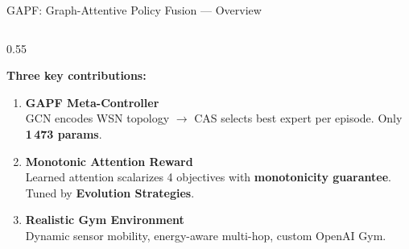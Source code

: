\documentclass[aspectratio=169, 11pt]{beamer}
\begin{document}
\begin{frame}{GAPF: Graph-Attentive Policy Fusion --- Overview}

\begin{columns}[T]
\begin{column}{0.55\textwidth}

  \textbf{Three key contributions:}
  \begin{enumerate}\setlength{\itemsep}{2pt}
    \item \textbf{GAPF Meta-Controller}\\
      {\small GCN encodes WSN topology $\to$ CAS selects best expert per episode. Only \colorbox{polyblue!10}{\textbf{1\,473 params}}.}

    \item \textbf{Monotonic Attention Reward}\\
      {\small Learned attention scalarizes 4 objectives with \textbf{monotonicity guarantee}. Tuned by \textbf{Evolution Strategies}.}

    \item \textbf{Realistic Gym Environment}\\
      {\small Dynamic sensor mobility, energy-aware multi-hop, custom OpenAI Gym.}
  \end{enumerate}


\end{column}
\end{columns}
\end{frame}
\end{document}
